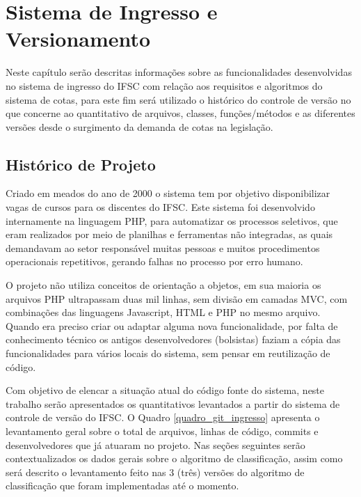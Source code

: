 \chapter{Sistema de Ingresso e Versionamento}
\label{historicoversoes}

Neste capítulo serão descritas informações sobre as funcionalidades desenvolvidas no sistema de ingresso do \gls{IFSC} com relação aos requisitos e algoritmos do sistema de cotas, para este fim será utilizado o histórico do controle de versão no que concerne ao quantitativo de arquivos, classes, funções/métodos e as diferentes versões desde o surgimento da demanda de cotas na legislação.

\section{Histórico de Projeto}
\label{historicopj}
Criado em meados do ano de 2000 o sistema tem por objetivo disponibilizar vagas de cursos para os discentes do \gls{IFSC}. Este sistema foi desenvolvido internamente na linguagem PHP, para automatizar os processos seletivos, que eram realizados por meio de planilhas e ferramentas não integradas, as quais demandavam ao setor responsável muitas pessoas e muitos procedimentos operacionais repetitivos, gerando falhas no processo por erro humano.

O projeto não utiliza conceitos de orientação a objetos, em sua maioria os arquivos PHP ultrapassam duas mil linhas, sem divisão em camadas \gls{MVC}, com combinações das linguagens Javascript, HTML e PHP no mesmo arquivo. Quando era preciso criar ou adaptar alguma nova funcionalidade, por falta de conhecimento técnico os antigos desenvolvedores (bolsistas) faziam a cópia das funcionalidades para vários locais do sistema, sem pensar em reutilização de código.

Com objetivo de elencar a situação atual do código fonte do sistema, neste trabalho serão apresentados os quantitativos levantados a partir do sistema de controle de versão do \gls{IFSC}. O Quadro \ref{quadro_git_ingresso} apresenta o levantamento geral sobre o total de arquivos, linhas de código, commits e desenvolvedores que já atuaram no projeto. Nas seções seguintes serão contextualizados os dados gerais sobre o algoritmo de classificação, assim como será descrito o levantamento feito nas 3 (três) versões do algoritmo de classificação que foram implementadas até o momento.




